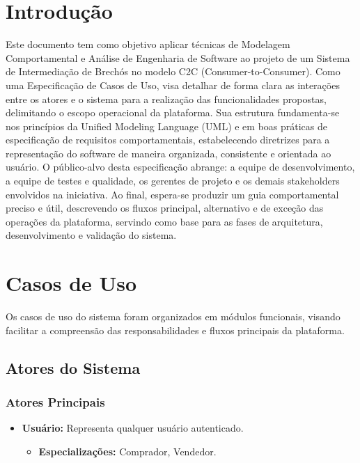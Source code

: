 \documentclass[
	article,			%
	11pt,				%
	oneside,			%
	a4paper,			%
	english,			%
	brazil,				%
	sumario=tradicional
	]{abntex2}
\begin{document}
\textual

\clearpage
\setcounter{page}{1}

\section{Introdução}
Este documento tem como objetivo aplicar técnicas de Modelagem Comportamental e Análise de Engenharia de Software ao projeto de um Sistema de Intermediação de Brechós no modelo C2C (Consumer-to-Consumer). Como uma Especificação de Casos de Uso, visa detalhar de forma clara as interações entre os atores e o sistema para a realização das funcionalidades propostas, delimitando o escopo operacional da plataforma.
Sua estrutura fundamenta-se nos princípios da Unified Modeling Language (UML) e em boas práticas de especificação de requisitos comportamentais, estabelecendo diretrizes para a representação do software de maneira organizada, consistente e orientada ao usuário. O público-alvo desta especificação abrange: a equipe de desenvolvimento, a equipe de testes e qualidade, os gerentes de projeto e os demais stakeholders envolvidos na iniciativa.
Ao final, espera-se produzir um guia comportamental preciso e útil, descrevendo os fluxos principal, alternativo e de exceção das operações da plataforma, servindo como base para as fases de arquitetura, desenvolvimento e validação do sistema.

\section{Casos de Uso}
\label{sec:CasosDeUso}

Os casos de uso do sistema foram organizados em módulos funcionais, visando facilitar a compreensão das responsabilidades e fluxos principais da plataforma.

\subsection{Atores do Sistema}
\label{sec:AtoresSistema}

\subsubsection{Atores Principais}
\begin{itemize}
    \item \textbf{Usuário:} Representa qualquer usuário autenticado.
    \begin{itemize}
        \item \textbf{Especializações:} Comprador, Vendedor.
    \end{itemize}
\end{itemize}
\end{document}
